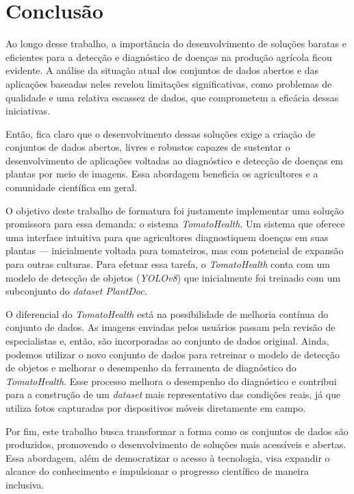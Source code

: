 \section{Conclusão}
Ao longo desse trabalho, a importância do desenvolvimento de soluções baratas e eficientes para a detecção e diagnóstico de doenças na produção agrícola ficou evidente. A análise da situação atual dos conjuntos de dados abertos e das aplicações baseadas neles revelou limitações significativas, como problemas de qualidade e uma relativa escassez de dados, que comprometem a eficácia dessas iniciativas.

Então, fica claro que o desenvolvimento dessas soluções exige a criação de conjuntos de dados abertos, livres e robustos capazes de sustentar o desenvolvimento de aplicações voltadas ao diagnóstico e detecção de doenças em plantas por meio de imagens. Essa abordagem beneficia os agricultores e a comunidade científica em geral.

O objetivo deste trabalho de formatura foi justamente implementar uma solução promissora para essa demanda: o sistema \emph{TomatoHealth}. Um sistema que oferece uma interface intuitiva para que agricultores diagnostiquem doenças em suas plantas --- inicialmente voltada para tomateiros, mas com potencial de expansão para outras culturas. Para efetuar essa tarefa, o \emph{TomatoHealth} conta com um modelo de detecção de objetos (\emph{YOLOv8}) que inicialmente foi treinado com um subconjunto do \emph{dataset PlantDoc}.

O diferencial do \emph{TomatoHealth} está na possibilidade de melhoria contínua do conjunto de dados. As imagens enviadas pelos usuários passam pela revisão de especialistas e, então, são incorporadas ao conjunto de dados original. Ainda, podemos utilizar o novo conjunto de dados para retreinar o modelo de detecção de objetos e melhorar o desempenho da ferramenta de diagnóstico do \emph{TomatoHealth}. Esse processo melhora o desempenho do diagnóstico e contribui para a construção de um \emph{dataset} mais representativo das condições reais, já que utiliza fotos capturadas por dispositivos móveis diretamente em campo.

Por fim, este trabalho busca transformar a forma como os conjuntos de dados são produzidos, promovendo o desenvolvimento de soluções mais acessíveis e abertas. Essa abordagem, além de democratizar o acesso à tecnologia, visa expandir o alcance do conhecimento e impulsionar o progresso científico de maneira inclusiva.
